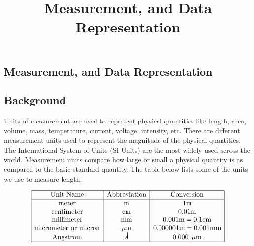 \documentclass{ximera}
\author{}
\title{Measurement, and Data Representation} \license{CC BY-NC-SA 4.0}
\begin{document}
\begin{abstract}
\end{abstract}
\maketitle

\begin{onlineOnly}
\section*{Measurement, and Data Representation}
\end{onlineOnly}
\subsection*{Background}
Units of measurement are used to represent physical quantities like length, area, volume, mass, temperature, current, voltage, intensity, etc.  There are different measurement units used to represent the magnitude of the physical quantities. The International System of Units (SI Units) are the most widely used across the world. Measurement units compare how large or small a physical quantity is as compared to the basic standard quantity.  The table below lists some of the units we use to measure length. 

$$\begin{array}{|c|c|c|} 
 \hline \text{Unit Name}&\text{Abbreviation}&\text{Conversion}\\ \hline 
 \text{meter}&\text{m}&1\text{m}\\
 \text{centimeter} &\text{cm}&0.01\text{m}\\
 \text{millimeter} &\text{mm}&0.001\text{m}=0.1\text{cm}\\
 \text{micrometer or micron} &\mu\text{m}&0.000001\text{m}=0.001\text{mm}\\
 \text{Angstrom} &\mathring{A} &0.0001\mu\text{m}\\
  \hline 
 \end{array}$$

\end{document}
